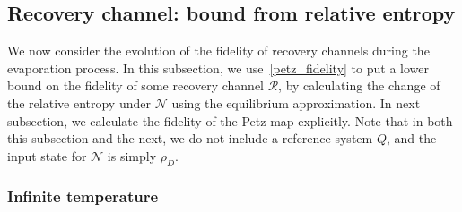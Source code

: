 \documentclass[a4paper,11pt]{article}
\newcommand{\SV}[1]{\textcolor{red}{#1}}
\newcommand\sN{{\ensuremath{{\mathcal N}}}}
\newcommand\sR{{\mathcal R}}
\begin{document}
\begin{enumerate}
\begin{comment}
For general diaries, we have the bounds
\begin{align}
 \frac{1}{{D}}\sum_{n= 0}^{D-1}S \left({\rho}^{(eq)}_{\beta_n,R}\right) \leq S\left( \rho^{(eq)}_{QR}\right) \leq \log D + \frac{1}{{D}}\sum_{n= 0}^{D-1}S \left({\rho}^{(eq)}_{\beta_n,R}\right) .
\end{align}
This is a well-known bound on entropies of mixtures of density matrices.

Alternatively, let's take large entropy diaries and finite temperature but assume that all $\beta_n$'s are approximately equal, $\simeq \tilde{\beta}$. This means that while the diary has a very large entropy, the spread in its energy spectrum is small compared to that of the black hole. The equilibrium density matrix for the radiation is thermal $\rho^{(eq)}_R \simeq \rho^{(eq)}_{\tilde{\beta}, R}$. In this case, \eqref{MI_QR_small_diary} holds even when the diary is large. 

The results in this section are consistent with those from Ref.~\cite{2020JHEP...09..002P}. There, it was explained that for large diaries, for the radiation to reconstruct the diary, it must have entropy greater than the black hole entropy plus the entropy of the diary. 

\SV{]}
\end{comment} 

\subsection{Recovery channel: bound from relative entropy} 

We now consider the evolution of the fidelity of recovery channels during the evaporation process. 
In this subsection, we use~\eqref{petz_fidelity} to put a lower bound on the fidelity of some recovery channel $\sR$, by calculating 
 the change of the relative entropy under $\mathcal{N}$ using the equilibrium approximation. In next subsection, we calculate the fidelity of the Petz map explicitly. Note that in both this subsection and the next, we do not include a reference system $Q$, and the input state for $\sN$ is simply $\rho_D$. 



\subsubsection{Infinite temperature}



\end{enumerate}
\end{document}

